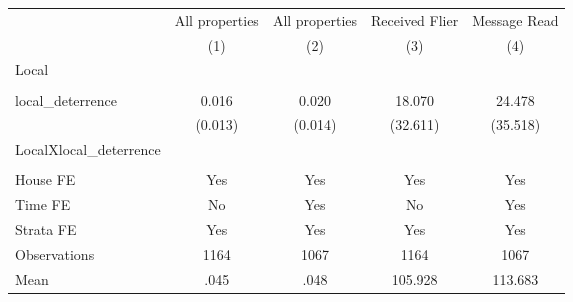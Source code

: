 {
\def\sym#1{\ifmmode^{#1}\else\(^{#1}\)\fi}
\begin{tabular}{l*{4}{c}}
\hline\hline
                &\multicolumn{1}{c}{All properties}&\multicolumn{1}{c}{All properties}&\multicolumn{1}{c}{Received Flier}&\multicolumn{1}{c}{Message Read}\\
                &\multicolumn{1}{c}{(1)}         &\multicolumn{1}{c}{(2)}         &\multicolumn{1}{c}{(3)}         &\multicolumn{1}{c}{(4)}         \\
\hline
Local           &                  &                  &                  &                  \\
                &                  &                  &                  &                  \\
local\_deterrence&    0.016         &    0.020         &   18.070         &   24.478         \\
                &  (0.013)         &  (0.014)         & (32.611)         & (35.518)         \\
LocalXlocal\_deterrence&                  &                  &                  &                  \\
                &                  &                  &                  &                  \\
House FE        &      Yes         &      Yes         &      Yes         &      Yes         \\
Time FE         &       No         &      Yes         &       No         &      Yes         \\
Strata FE       &      Yes         &      Yes         &      Yes         &      Yes         \\
\hline
Observations    &     1164         &     1067         &     1164         &     1067         \\
Mean            &     .045         &     .048         &  105.928         &  113.683         \\
\hline\hline
\end{tabular}
}
